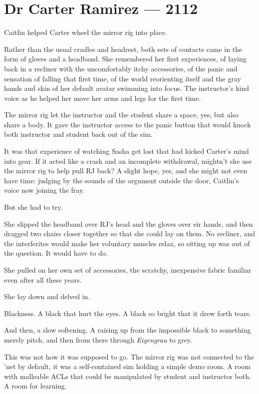 \hypertarget{dr-carter-ramirez-2112}{%
\chapter*{Dr Carter Ramirez — 2112}\label{dr-carter-ramirez-2112}}

Caitlin helped Carter wheel the mirror rig into place.

Rather than the usual cradles and headrest, both sets of contacts came in the form of gloves and a headband. She remembered her first experiences, of laying back in a recliner with the uncomfortably itchy accessories, of the panic and sensation of falling that first time, of the world reorienting itself and the gray hands and skin of her default avatar swimming into focus. The instructor's kind voice as he helped her move her arms and legs for the first time.

The mirror rig let the instructor and the student share a space, yes, but also share a body. It gave the instructor access to the panic button that would knock both instructor and student back out of the sim.

It was that experience of watching Sasha get lost that had kicked Carter's mind into gear. If it acted like a crash and an incomplete withdrawal, mightn't she use the mirror rig to help pull RJ back? A slight hope, yes, and she might not even have time: judging by the sounds of the argument outside the door, Caitlin's voice now joining the fray.

But she had to try.

She slipped the headband over RJ's head and the gloves over eir hands, and then dragged two chairs closer together so that she could lay on them. No recliner, and the interferites would make her voluntary muscles relax, so sitting up was out of the question. It would have to do.

She pulled on her own set of accessories, the scratchy, inexpensive fabric familiar even after all these years.

She lay down and delved in.

Blackness. A black that hurt the eyes. A black so bright that it drew forth tears.

And then, a slow softening. A raising up from the impossible black to something merely pitch, and then from there through \emph{Eigengrau} to grey.

This was not how it was supposed to go. The mirror rig was not connected to the 'net by default, it was a self-contained sim holding a simple demo room. A room with malleable ACLs that could be manipulated by student and instructor both. A room for learning.

